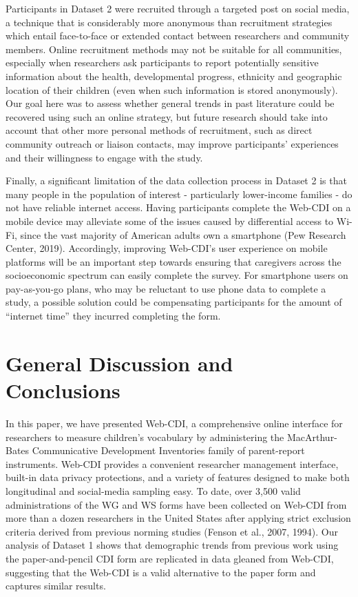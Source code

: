 \documentclass[
  english,
  ,man,floatsintext]{apa6}
\begin{document}
Participants in Dataset 2 were recruited through a targeted post on social media, a technique that is considerably more anonymous than recruitment strategies which entail face-to-face or extended contact between researchers and community members. Online recruitment methods may not be suitable for all communities, especially when researchers ask participants to report potentially sensitive information about the health, developmental progress, ethnicity and geographic location of their children (even when such information is stored anonymously). Our goal here was to assess whether general trends in past literature could be recovered using such an online strategy, but future research should take into account that other more personal methods of recruitment, such as direct community outreach or liaison contacts, may improve participants' experiences and their willingness to engage with the study.

Finally, a significant limitation of the data collection process in Dataset 2 is that many people in the population of interest - particularly lower-income families - do not have reliable internet access. Having participants complete the Web-CDI on a mobile device may alleviate some of the issues caused by differential access to Wi-Fi, since the vast majority of American adults own a smartphone (Pew Research Center, 2019). Accordingly, improving Web-CDI's user experience on mobile platforms will be an important step towards ensuring that caregivers across the socioeconomic spectrum can easily complete the survey. For smartphone users on pay-as-you-go plans, who may be reluctant to use phone data to complete a study, a possible solution could be compensating participants for the amount of ``internet time'' they incurred completing the form.

\hypertarget{general-discussion-and-conclusions}{%
\section{General Discussion and Conclusions}\label{general-discussion-and-conclusions}}

In this paper, we have presented Web-CDI, a comprehensive online interface for researchers to measure children's vocabulary by administering the MacArthur-Bates Communicative Development Inventories family of parent-report instruments. Web-CDI provides a convenient researcher management interface, built-in data privacy protections, and a variety of features designed to make both longitudinal and social-media sampling easy. To date, over 3,500 valid administrations of the WG and WS forms have been collected on Web-CDI from more than a dozen researchers in the United States after applying strict exclusion criteria derived from previous norming studies (Fenson et al., 2007, 1994). Our analysis of Dataset 1 shows that demographic trends from previous work using the paper-and-pencil CDI form are replicated in data gleaned from Web-CDI, suggesting that the Web-CDI is a valid alternative to the paper form and captures similar results.
\end{document}

